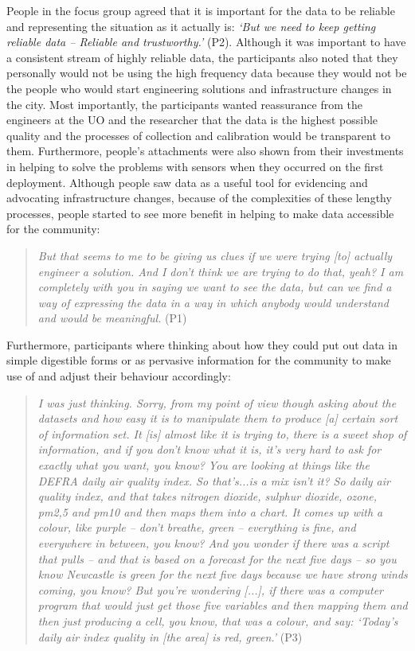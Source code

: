 People in the focus group agreed that it is important for the data to be reliable and representing the situation as it actually is: \textit{`But we need to keep getting reliable data -- Reliable and trustworthy.'} (P2). Although it was important to have a consistent stream of highly reliable data, the participants also noted that they personally would not be using the high frequency data because they would not be the people who would start engineering solutions and infrastructure changes in the city. Most importantly, the participants wanted reassurance from the engineers at the UO and the researcher that the data is the highest possible quality and the processes of collection and calibration would be transparent to them. Furthermore, people's attachments were also shown from their investments in helping to solve the problems with sensors when they occurred on the first deployment. Although people saw data as a useful tool for evidencing and advocating infrastructure changes, because of the complexities of these lengthy processes, people started to see more benefit in helping to make data accessible for the community:
\begin{quote}
    \textit{But that seems to me to be giving us clues if we were trying [to] actually engineer a solution. And I don't think we are trying to do that, yeah? I am completely with you in saying we want to see the data, but can we find a way of expressing the data in a way in which anybody would understand and would be meaningful.} (P1)
\end{quote}

Furthermore, participants where thinking about how they could put out data in simple digestible forms or as pervasive information for the community to make use of and adjust their behaviour accordingly:
\begin{quote}
    \textit{I was just thinking. Sorry, from my point of view though asking about the datasets and how easy it is to manipulate them to produce [a] certain sort of information set. It [is] almost like it is trying to, there is a sweet shop of information, and if you don't know what it is, it's very hard to ask for exactly what you want, you know? You are looking at things like the DEFRA daily air quality index. So that's...is a mix isn't it? So daily air quality index, and that takes nitrogen dioxide, sulphur dioxide, ozone, pm2,5 and pm10 and then maps them into a chart. It comes up with a colour, like purple -- don't breathe, green -- everything is fine, and everywhere in between, you know? And you wonder if there was a script that pulls -- and that is based on a forecast for the next five days -- so you know Newcastle is green for the next five days because we have strong winds coming, you know? But you're wondering [...], if there was a computer program that would just get those five variables and then mapping them and then just producing a cell, you know, that was a colour, and say: `Today's daily air index quality in [the area] is red, green.'} (P3)
\end{quote}


